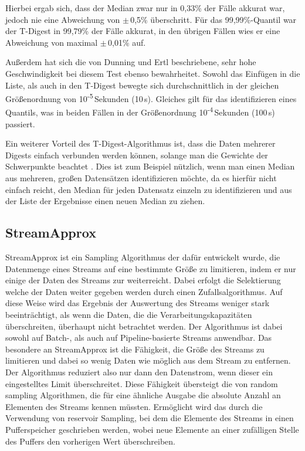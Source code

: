 Hierbei ergab sich, dass der Median zwar nur in 0,33\% der Fälle akkurat war, jedoch nie eine Abweichung von $\pm$\,0,5\% überschritt.
Für das 99,99\%-Quantil war der T-Digest in 99,79\% der Fälle akkurat, in den übrigen Fällen wies er eine Abweichung von maximal $\pm$\,0,01\% auf.

Außerdem hat sich die von Dunning und Ertl \cite{dunning2019} beschriebene, sehr hohe Geschwindigkeit bei diesem Test ebenso bewahrheitet.
Sowohl das Einfügen in die Liste, als auch in den T-Digest bewegte sich durchschnittlich in der gleichen Größenordnung von 10\textsuperscript{-5}\,Sekunden (10\,\textmu{}s).
Gleiches gilt für das identifizieren eines Quantils, was in beiden Fällen in der Größenordnung 10\textsuperscript{-4}\,Sekunden (100\,\textmu{}s) passiert.

Ein weiterer Vorteil des T-Digest-Algorithmus ist, dass die Daten mehrerer Digests einfach verbunden werden können, solange man die Gewichte der Schwerpunkte beachtet \cite{dunning2019}.
Dies ist zum Beispiel nützlich, wenn man einen Median aus mehreren, großen Datensätzen identifizieren möchte, da es hierfür nicht einfach reicht, den Median für jeden Datensatz einzeln zu identifizieren und aus der Liste der Ergebnisse einen neuen Median zu ziehen.



\subsection{StreamApprox}
StreamApprox ist ein Sampling Algorithmus der dafür entwickelt wurde, 
die Datenmenge eines Streams auf eine bestimmte Größe zu limitieren, 
indem er nur einige der Daten des Streams zur weiterreicht. 
Dabei erfolgt die Selektierung welche der Daten weiter gegeben werden durch einen Zufallsalgorithmus. 
Auf diese Weise wird das Ergebnis der Auswertung des Streams weniger stark beeinträchtigt, 
als wenn die Daten, die die Verarbeitungskapazitäten überschreiten, 
überhaupt nicht betrachtet werden. 
Der Algorithmus ist dabei sowohl auf Batch-, als auch auf Pipeline-basierte Streams anwendbar.
Das besondere an StreamApprox ist die Fähigkeit, 
die Größe des Streams zu limitieren und dabei so wenig Daten wie möglich aus dem Stream zu entfernen. 
Der Algorithmus reduziert also nur dann den Datenstrom, wenn dieser ein eingestelltes Limit überschreitet. 
Diese Fähigkeit übersteigt die von random sampling Algorithmen, 
die für eine ähnliche Ausgabe die absolute Anzahl an Elementen des Streams kennen müssten. 
Ermöglicht wird das durch die Verwendung von reservoir Sampling, 
bei dem die Elemente des Streams in einen Pufferspeicher geschrieben werden, 
wobei neue Elemente an einer zufälligen Stelle des Puffers den vorherigen Wert überschreiben. \cite{quoc2017} 

